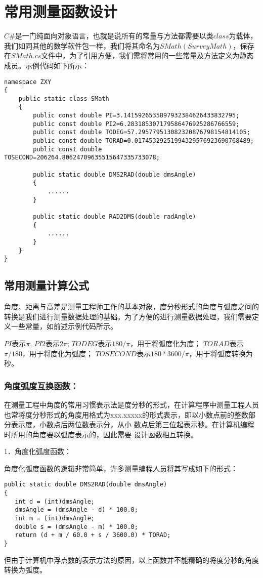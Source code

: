 
\chapter{常用测量函数设计}

$C\#$是一门纯面向对象语言，也就是说所有的常量与方法都需要以类$class$为载体，我们如同其他的数学软件包一样，我们将其命名为$SMath(SurveyMath)$，保存在$SMath.cs$文件中，为了引用方便，我们需将常用的一些常量及方法定义为静态成员。示例代码如下所示：
\begin{verbatim}
namespace ZXY
{
    public static class SMath
    {
        public const double PI=3.1415926535897932384626433832795;
        public const double PI2=6.283185307179586476925286766559;
        public const double TODEG=57.295779513082320876798154814105;
        public const double TORAD=0.01745329251994329576923690768489;
        public const double TOSECOND=206264.80624709635515647335733078;
    
        public static double DMS2RAD(double dmsAngle)
        {
            ......
        }
    
        public static double RAD2DMS(double radAngle)
        {
            ......
        }
    }
}
\end{verbatim}

\section{常用测量计算公式}
角度、距离与高差是测量工程师工作的基本对象，度分秒形式的角度与弧度之间的转换是我们进行测量数据处理的基础。为了方便的进行测量数据处理，我们需要定义一些常量，如前述示例代码所示。

$PI$表示$\pi$, $PI2$表示$2\pi$;
$TODEG$表示$180/\pi$，用于将弧度化为度；
$TORAD$表示$\pi/180$，用于将度化为弧度；
$TOSECOND$表示$180*3600/\pi$，用于将弧度转换为秒。

\subsection{角度弧度互换函数：}

 在测量工程中角度的常用习惯表示法是度分秒的形式，在计算程序中测量工程人员也常将度分秒形式的角度用格式为xxx.xxxxx的形式表示，即以小数点前的整数部分表示度，小数点后两位数表示分，从小
 数点后第三位起表示秒。在计算机编程时所用的角度要以弧度表示的，因此需要
 设计函数相互转换。

1．角度化弧度函数：

角度化弧度函数的逻辑非常简单，许多测量编程人员将其写成如下的形式：
\begin{verbatim}
public static double DMS2RAD(double dmsAngle)
{
   int d = (int)dmsAngle;
   dmsAngle = (dmsAngle - d) * 100.0;
   int m = (int)dmsAngle;
   double s = (dmsAngle - m) * 100.0;
   return (d + m / 60.0 + s / 3600.0) * TORAD;
}
\end{verbatim}
但由于计算机中浮点数的表示方法的原因，以上函数并不能精确的将度分秒的角度转换为弧度。

